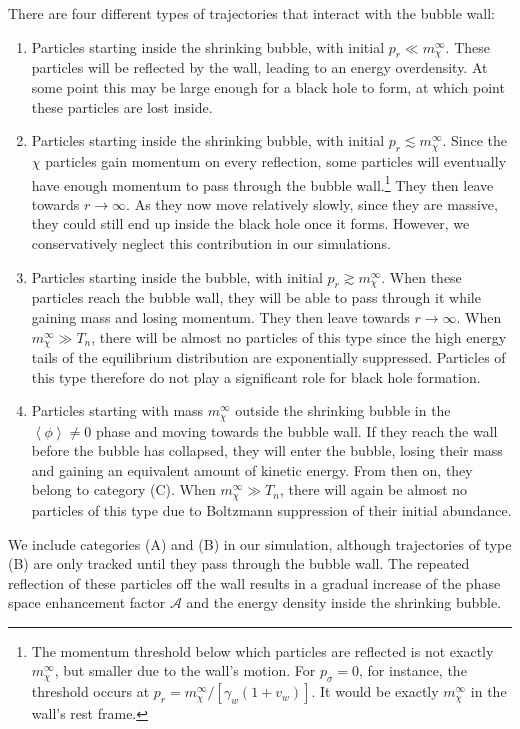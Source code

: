 \documentclass[
onecolumn, %
11pt, %
tightenlines,
superscriptaddress, %
nofootinbib, %
preprintnumbers, %
prd %
]{revtex4-1}
\newcommand{\ev}[1]{\ensuremath{\left\langle #1 %
        \right\rangle}} %
\newcommand{\A}{\ensuremath{\mathcal A}\xspace}
\begin{document}
There are four different types of trajectories that interact with the bubble wall:
%
\begin{enumerate}[label=(\Alph*)]
    \item Particles starting inside the shrinking bubble, with initial $p_r \ll m_\chi^\infty$. These particles will be reflected by the wall, leading to an energy overdensity.  At some point this may be large enough for a black hole to form, at which point these particles are lost inside.
    \item Particles starting inside the shrinking bubble, with initial $p_r \lesssim m_\chi^\infty$. Since the $\chi$ particles gain momentum on every reflection, some particles will eventually have enough momentum to pass through the bubble wall.\footnote{The momentum threshold below which particles are reflected is not exactly $m_\chi^\infty$, but smaller due to the wall's motion.  For $p_\sigma = 0$, for instance, the threshold occurs at $p_r = m_\chi^\infty/[\gamma_w(1+v_w)]$. It would be exactly $m_\chi^\infty$ in the wall's rest frame.}  They then leave towards $r\to\infty$. As they now move relatively slowly, since they are massive, they could still end up inside the black hole once it forms.  However, we conservatively neglect this contribution in our simulations.
    \item Particles starting inside the bubble, with initial $p_r \gtrsim m_\chi^\infty$. When these particles reach the bubble wall, they will be able to pass through it while gaining mass and losing momentum. They then leave towards $r\to\infty$.  When $m_\chi^\infty \gg T_n$, there will be almost no particles of this type since the high energy tails of the equilibrium distribution are exponentially suppressed. Particles of this type therefore do not play a significant role for black hole formation.
    \item Particles starting with mass $m_\chi^\infty$ outside the shrinking bubble in the $\ev{\phi} \neq 0$ phase and moving towards the bubble wall. If they reach the wall before the bubble has collapsed, they will enter the bubble, losing their mass and gaining an equivalent amount of kinetic energy. From then on, they belong to category (C).  When $m_\chi^\infty \gg T_n$, there will again be almost no particles of this type due to Boltzmann suppression of their initial abundance.
\end{enumerate}
%
We include categories (A) and (B) in our simulation, although trajectories of type (B) are only tracked until they pass through the bubble wall.  The repeated reflection of these particles off the wall results in a gradual increase of the phase space enhancement factor $\A$ and the energy density inside the shrinking bubble. 
\end{document}
